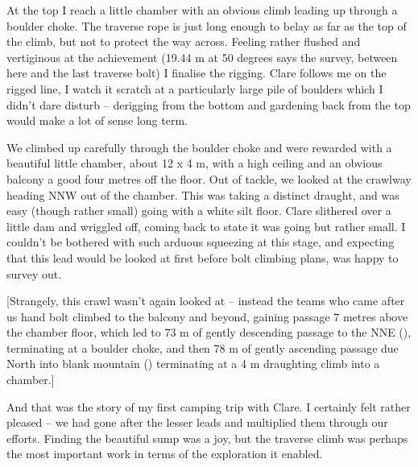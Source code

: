 At the top I reach a little chamber with an obvious climb leading up
through a boulder choke. The traverse rope is just long enough to belay
as far as the top of the climb, but not to protect the way across.
Feeling rather flushed and vertiginous at the achievement (19.44 m at 50
degrees says the survey, between here and the last traverse bolt) I
finalise the rigging. Clare follows me on the rigged line, I watch it
scratch at a particularly large pile of boulders which I didn't dare
disturb -- derigging from the bottom and gardening back from the top
would make a lot of sense long term.

We climbed up carefully through the boulder choke and were rewarded with
a beautiful little chamber, about 12 x 4 m, with a high ceiling and an
obvious balcony a good four metres off the floor. Out of tackle, we looked
at the crawlway heading NNW out of the chamber. This was taking a
distinct draught, and was easy (though rather small) going with a white
silt floor. Clare slithered over a little dam and wriggled off, coming
back to state it was going but rather small. I couldn't be bothered with
such arduous squeezing at this stage, and expecting that this lead would
be looked at first before bolt climbing plans, was happy to survey out.

[Strangely, this crawl wasn't again looked at -- instead the teams who
came after us hand bolt climbed to the balcony and beyond, gaining
passage 7 metres above the chamber floor, which led to 73 m of gently
descending passage to the NNE (), terminating at a boulder
choke, and then 78 m of gently ascending passage due North into blank
mountain () terminating at a 4 m draughting climb
into a chamber.]



And that was the story of my first camping trip with Clare. I certainly
felt rather pleased -- we had gone after the lesser leads and multiplied
them through our efforts. Finding the beautiful 
sump was a joy, but the  traverse climb was perhaps the most
important work in terms of the exploration it enabled.


